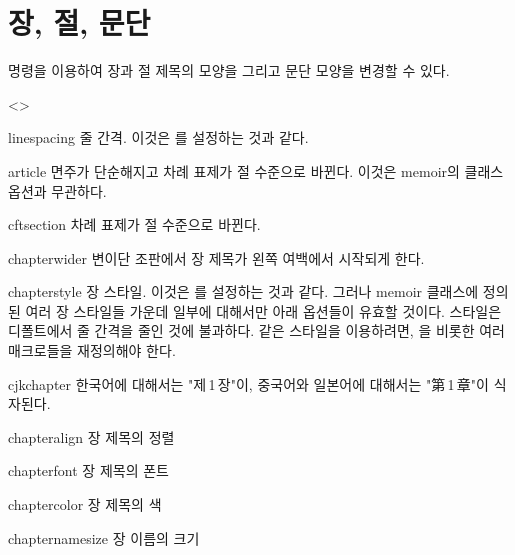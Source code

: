 \documentclass[pairquote, minted]{hzguide}
\begin{document}
\section{장, 절, 문단}

\macro{\HeadingSetup} 명령을 이용하여 장과 절 제목의 모양을 그리고 문단 모양을 변경할 수 있다. 

\begin{code}
\end{code}

\begin{macros}<\HeadingSetup>
\item[linespacing]  
줄 간격. 이것은 \macro{\baselinestretch}를 설정하는 것과 같다.

\item[article] \keyvalueTF
면주가 단순해지고 차례 표제가 절 수준으로 바뀐다. 
이것은 memoir의  클래스 옵션과 무관하다.

\item[cftsection] \keyvalueTF
차례 표제가 절 수준으로 바뀐다. 

\item[chapterwider] \keyvalueTF
변이단 조판에서 장 제목가 왼쪽 여백에서 시작되게 한다.

\item[chapterstyle] 
장 스타일. 이것은 \macro{\chapterstyle}를 설정하는 것과 같다. 
그러나 memoir 클래스에 정의된 여러 장 스타일들 가운데 일부에 대해서만 아래 옵션들이 유효할 것이다.
 스타일은 디폴트에서 줄 간격을 줄인 것에 불과하다.
 같은 스타일을 이용하려면, \macro{\printerchaptername}을 비롯한 여러 매크로들을 재정의해야 한다.

\item[cjkchapter] \keyvalueTF
한국어에 대해서는 "제\,1\,장"이, 중국어와 일본어에 대해서는 "第\,1\,章"이 식자된다.

\item[chapteralign] \keyvalue{\raggedleft, \centering, \raggedright}
장 제목의 정렬

\item[chapterfont] \keyvalue{\normalfont\bfseries}
장 제목의 폰트

\item[chaptercolor] 
장 제목의 색

\item[chapternamesize] \keyvalue{\huge}
장 이름의 크기 


\end{macros}
\end{document}
